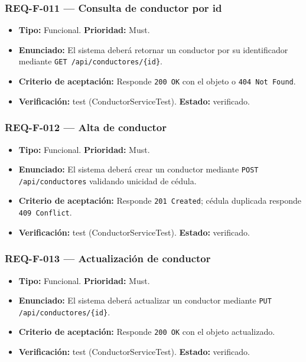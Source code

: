 \documentclass[12pt,a4paper]{article}
\begin{document}
\subsubsection{REQ-F-011 --- Consulta de conductor por id}
\begin{itemize}
  \item \textbf{Tipo:} Funcional. \textbf{Prioridad:} Must.
  \item \textbf{Enunciado:} El sistema deberá retornar un conductor por su identificador mediante \texttt{GET /api/conductores/\{id\}}.
  \item \textbf{Criterio de aceptación:} Responde \texttt{200 OK} con el objeto o \texttt{404 Not Found}.
  \item \textbf{Verificación:} test (ConductorServiceTest). \textbf{Estado:} verificado.
\end{itemize}

\subsubsection{REQ-F-012 --- Alta de conductor}
\begin{itemize}
  \item \textbf{Tipo:} Funcional. \textbf{Prioridad:} Must.
  \item \textbf{Enunciado:} El sistema deberá crear un conductor mediante \texttt{POST /api/conductores} validando unicidad de cédula.
  \item \textbf{Criterio de aceptación:} Responde \texttt{201 Created}; cédula duplicada responde \texttt{409 Conflict}.
  \item \textbf{Verificación:} test (ConductorServiceTest). \textbf{Estado:} verificado.
\end{itemize}

\subsubsection{REQ-F-013 --- Actualización de conductor}
\begin{itemize}
  \item \textbf{Tipo:} Funcional. \textbf{Prioridad:} Must.
  \item \textbf{Enunciado:} El sistema deberá actualizar un conductor mediante \texttt{PUT /api/conductores/\{id\}}.
  \item \textbf{Criterio de aceptación:} Responde \texttt{200 OK} con el objeto actualizado.
  \item \textbf{Verificación:} test (ConductorServiceTest). \textbf{Estado:} verificado.
\end{itemize}
\end{document}
